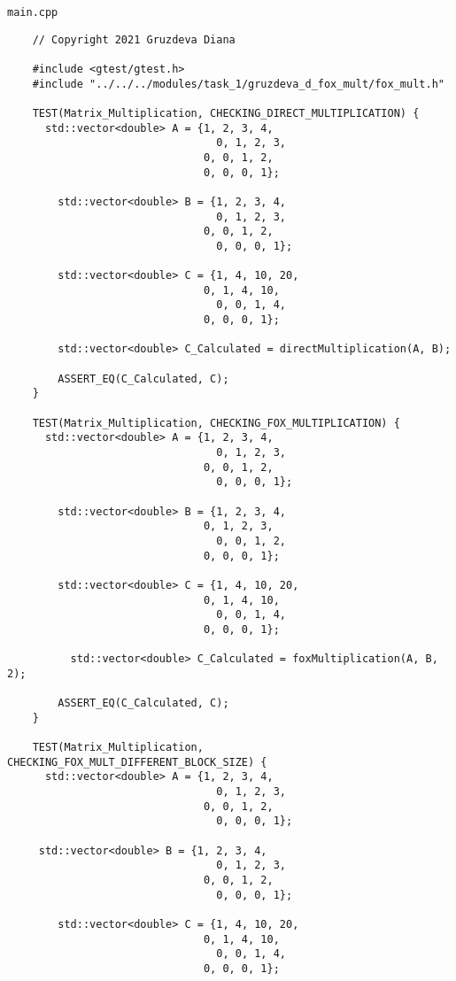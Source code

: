 \documentclass{article}
\begin{document}
\par
\lstinline$main.cpp$
\begin{lstlisting}
	// Copyright 2021 Gruzdeva Diana

	#include <gtest/gtest.h>
	#include "../../../modules/task_1/gruzdeva_d_fox_mult/fox_mult.h"

	TEST(Matrix_Multiplication, CHECKING_DIRECT_MULTIPLICATION) {
  	  std::vector<double> A = {1, 2, 3, 4,
        	                     0, 1, 2, 3,
      	                       0, 0, 1, 2,
          	                   0, 0, 0, 1};

    	std::vector<double> B = {1, 2, 3, 4,
            	                 0, 1, 2, 3,
              	               0, 0, 1, 2,
                	             0, 0, 0, 1};

    	std::vector<double> C = {1, 4, 10, 20,
      	                       0, 1, 4, 10,
        	                     0, 0, 1, 4,
          	                   0, 0, 0, 1};

    	std::vector<double> C_Calculated = directMultiplication(A, B);

    	ASSERT_EQ(C_Calculated, C);
	}

	TEST(Matrix_Multiplication, CHECKING_FOX_MULTIPLICATION) {
  	  std::vector<double> A = {1, 2, 3, 4,
    	                         0, 1, 2, 3,
      	                       0, 0, 1, 2,
        	                     0, 0, 0, 1};

    	std::vector<double> B = {1, 2, 3, 4,
      	                       0, 1, 2, 3,
        	                     0, 0, 1, 2,
          	                   0, 0, 0, 1};

    	std::vector<double> C = {1, 4, 10, 20,
      	                       0, 1, 4, 10,
        	                     0, 0, 1, 4,
          	                   0, 0, 0, 1};

 		  std::vector<double> C_Calculated = foxMultiplication(A, B, 2);

    	ASSERT_EQ(C_Calculated, C);
	}

	TEST(Matrix_Multiplication, CHECKING_FOX_MULT_DIFFERENT_BLOCK_SIZE) {
  	  std::vector<double> A = {1, 2, 3, 4,
    	                         0, 1, 2, 3,
      	                       0, 0, 1, 2,
        	                     0, 0, 0, 1};

   	 std::vector<double> B = {1, 2, 3, 4,
    	                         0, 1, 2, 3,
      	                       0, 0, 1, 2,
        	                     0, 0, 0, 1};

    	std::vector<double> C = {1, 4, 10, 20,
      	                       0, 1, 4, 10,
        	                     0, 0, 1, 4,
          	                   0, 0, 0, 1};


\end{lstlisting}
\end{document}
